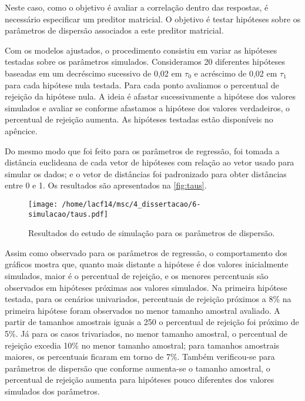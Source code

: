 Neste caso, como o objetivo é avaliar a correlação dentro das respostas, é necessário especificar um preditor matricial. O objetivo é testar hipóteses sobre os parâmetros de dispersão associados a este preditor matricial. 

Com os modelos ajustados, o procedimento consistiu em variar as hipóteses testadas sobre os parâmetros simulados. Consideramos 20 diferentes hipóteses baseadas em um decréscimo sucessivo de 0,02 em $\tau_0$ e acréscimo de 0,02 em $\tau_1$ para cada hipótese nula testada. Para cada ponto avaliamos o percentual de rejeição da hipótese nula. A ideia é afastar sucessivamente a hipótese dos valores simulados e avaliar se conforme afastamos a hipótese dos valores verdadeiros, o percentual de rejeição aumenta. As hipóteses testadas estão disponíveis no apêncice.

Do mesmo modo que foi feito para os parâmetros de regressão, foi tomada a distância euclideana de cada vetor de hipóteses com relação ao vetor usado para simular os dados; e o vetor de distâncias foi padronizado para obter distâncias entre 0 e 1. Os resultados são apresentados na \autoref{fig:taus}.

\begin{figure}[H]
\centering
\texttt{[image: /home/lacf14/msc/4\_dissertacao/6-simulacao/taus.pdf]}
\caption{Resultados do estudo de simulação para os parâmetros de dispersão.}
\label{fig:taus}
\end{figure}

Assim como observado para os parâmetros de regressão, o comportamento dos gráficos mostra que, quanto mais distante a hipótese é dos valores inicialmente simulados, maior é o percentual de rejeição, e os menores percentuais são observados em hipóteses próximas aos valores simulados. Na primeira hipótese testada, para os cenários univariados, percentuais de rejeição próximos a 8\% na primeira hipótese foram observados no menor tamanho amostral avaliado. A partir de tamanhos amostrais iguais a 250 o percentual de rejeição foi próximo de 5\%. Já para os casos trivariados, no menor tamanho amostral, o percentual de rejeição excedia 10\% no menor tamanho amostral; para tamanhos amostrais maiores, os percentuais ficaram em torno de 7\%. Também verificou-se para parâmetros de dispersão que conforme aumenta-se o tamanho amostral, o percentual de rejeição aumenta para hipóteses pouco diferentes dos valores simulados dos parâmetros.

